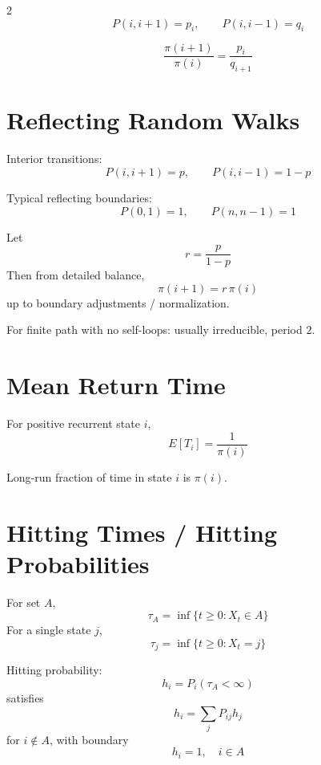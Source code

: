 \documentclass[10pt]{article}
\begin{document}
\begin{multicols}{2}
\[
P(i,i+1)=p_i,\qquad P(i,i-1)=q_i
\]

\begin{formulabox}
\[
\frac{\pi(i+1)}{\pi(i)}=\frac{p_i}{q_{i+1}}
\]
\end{formulabox}

\section{Reflecting Random Walks}

Interior transitions:
\[
P(i,i+1)=p,\qquad P(i,i-1)=1-p
\]

Typical reflecting boundaries:
\[
P(0,1)=1,\qquad P(n,n-1)=1
\]

\begin{formulabox}
Let
\[
r=\frac{p}{1-p}
\]
Then from detailed balance,
\[
\pi(i+1)=r\,\pi(i)
\]
up to boundary adjustments / normalization.
\end{formulabox}

For finite path with no self-loops: usually irreducible, period \(2\).

\section{Mean Return Time}

\begin{formulabox}
For positive recurrent state \(i\),
\[
E[T_i]=\frac{1}{\pi(i)}
\]
\end{formulabox}

Long-run fraction of time in state \(i\) is \(\pi(i)\).

\section{Hitting Times / Hitting Probabilities}

\begin{definitionbox}
For set \(A\),
\[
\tau_A=\inf\{t\ge 0: X_t\in A\}
\]
For a single state \(j\),
\[
\tau_j=\inf\{t\ge 0: X_t=j\}
\]
\end{definitionbox}

\begin{formulabox}
Hitting probability:
\[
h_i=P_i(\tau_A<\infty)
\]
satisfies
\[
h_i=\sum_j P_{ij}h_j
\]
for \(i\notin A\), with boundary
\[
h_i=1,\quad i\in A
\]
\end{formulabox}


\end{multicols}
\end{document}
